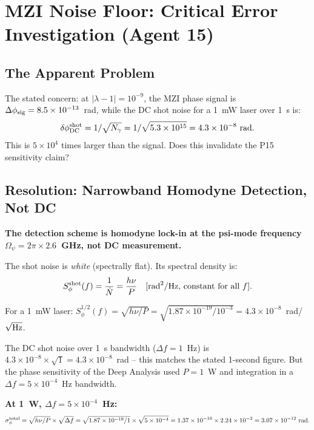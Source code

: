 \documentclass[11pt]{article}
\newcommand{\ee}[1]{\times 10^{#1}}
\begin{document}
\section{MZI Noise Floor: Critical Error Investigation (Agent 15)}
\label{sec:a15-mzi}

\subsection{The Apparent Problem}

The stated concern: at $|\lambda-1| = 10^{-9}$, the MZI phase signal is
$\Delta\phi_{\rm sig} = 8.5\ee{-13}$~rad, while the DC shot noise for a
1~mW laser over 1~s is:
\begin{equation}
\delta\phi_{\rm DC}^{\rm shot} = 1/\sqrt{N_\gamma} = 1/\sqrt{5.3\ee{15}} = 4.3\ee{-8}~{\rm rad}.
\end{equation}
This is $5 \times 10^4$ times larger than the signal. Does this invalidate
the P15 sensitivity claim?

\subsection{Resolution: Narrowband Homodyne Detection, Not DC}

\textbf{The detection scheme is homodyne lock-in at the psi-mode frequency
$\Omega_\psi = 2\pi \times 2.6$~GHz, not DC measurement.}

The shot noise is \emph{white} (spectrally flat). Its spectral density is:
\begin{equation}
S_\phi^{\rm shot}(f) = \frac{1}{\dot{N}} = \frac{h\nu}{P}
\quad [\text{rad}^2/\text{Hz, constant for all } f].
\end{equation}

For a 1~mW laser:
$S_\phi^{1/2}(f) = \sqrt{h\nu/P} = \sqrt{1.87\ee{-19}/10^{-3}} = 4.3\ee{-8}$~rad/$\sqrt{\rm Hz}$.

The DC shot noise over 1~s bandwidth ($\Delta f = 1$~Hz) is $4.3\ee{-8} \times \sqrt{1} = 4.3\ee{-8}$~rad -- this matches the stated 1-second figure. But the phase sensitivity of the Deep Analysis used $P = 1$~W and integration in a $\Delta f = 5\ee{-4}$~Hz bandwidth.

\textbf{At 1~W, $\Delta f = 5\ee{-4}$~Hz:}
\begin{equation}
\sigma_\phi^{\rm total} = \sqrt{h\nu/P} \times \sqrt{\Delta f}
= \sqrt{1.87\ee{-19}/1} \times \sqrt{5\ee{-4}}
= 1.37\ee{-10} \times 2.24\ee{-2} = 3.07\ee{-12}~{\rm rad}.
\end{equation}
\end{document}
